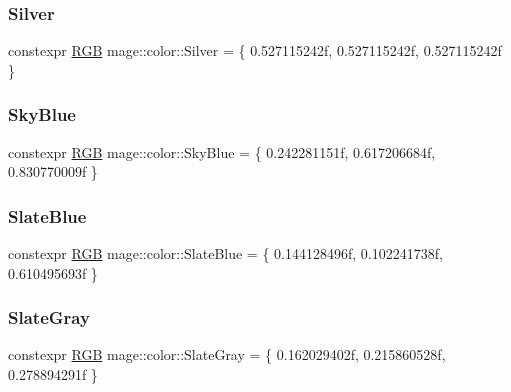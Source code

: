 \hypertarget{namespacemage_1_1color_a3096a544f2ff01351f010eb5f36f27fa}{}\label{namespacemage_1_1color_a3096a544f2ff01351f010eb5f36f27fa} 
\subsubsection{\texorpdfstring{Silver}{Silver}}
{\footnotesize\ttfamily constexpr \hyperlink{structmage_1_1_r_g_b}{R\+GB} mage\+::color\+::\+Silver = \{ 0.\+527115242f, 0.\+527115242f, 0.\+527115242f \}}

\hypertarget{namespacemage_1_1color_a339e4398bfd1cb4ac82f65578c9cfd1d}{}\label{namespacemage_1_1color_a339e4398bfd1cb4ac82f65578c9cfd1d} 
\subsubsection{\texorpdfstring{Sky\+Blue}{SkyBlue}}
{\footnotesize\ttfamily constexpr \hyperlink{structmage_1_1_r_g_b}{R\+GB} mage\+::color\+::\+Sky\+Blue = \{ 0.\+242281151f, 0.\+617206684f, 0.\+830770009f \}}

\hypertarget{namespacemage_1_1color_a0050809618b8a86850ccfee8b48e3d71}{}\label{namespacemage_1_1color_a0050809618b8a86850ccfee8b48e3d71} 
\subsubsection{\texorpdfstring{Slate\+Blue}{SlateBlue}}
{\footnotesize\ttfamily constexpr \hyperlink{structmage_1_1_r_g_b}{R\+GB} mage\+::color\+::\+Slate\+Blue = \{ 0.\+144128496f, 0.\+102241738f, 0.\+610495693f \}}

\hypertarget{namespacemage_1_1color_a1553763ab8b4309ffb51fc4f48ed2a12}{}\label{namespacemage_1_1color_a1553763ab8b4309ffb51fc4f48ed2a12} 
\subsubsection{\texorpdfstring{Slate\+Gray}{SlateGray}}
{\footnotesize\ttfamily constexpr \hyperlink{structmage_1_1_r_g_b}{R\+GB} mage\+::color\+::\+Slate\+Gray = \{ 0.\+162029402f, 0.\+215860528f, 0.\+278894291f \}}

